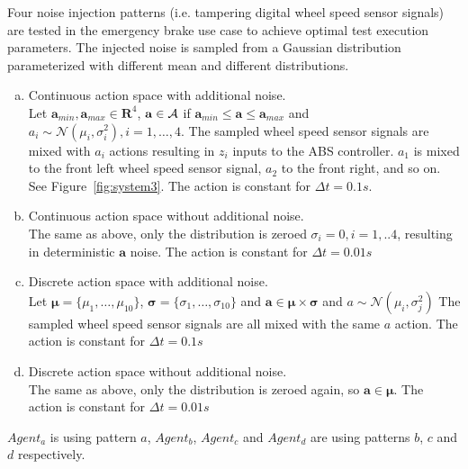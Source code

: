 \documentclass[a4paper, fleqn]{template/cas-dc}
\begin{document}
	Four noise injection patterns (i.e. tampering digital wheel speed sensor signals) are tested in the emergency brake use case to achieve optimal test execution parameters. The injected noise is sampled from a Gaussian distribution parameterized with different mean and different distributions.
	
	\begin{enumerate}[a)]
		\item Continuous action space with additional noise.\\
		Let $\mathbf{a}_{min}, \mathbf{a}_{max} \in \mathbf{R}^4$, $\mathbf{a} \in \mathcal{A}$ if $\mathbf{a}_{min} \leq \mathbf{a} \leq \mathbf{a}_{max}$ and $a_i \sim \mathcal{N}(\mu_i, \sigma_i^2), i=1,\ldots,4$. The sampled wheel speed sensor signals are mixed with $a_i$ actions resulting in $z_i$ inputs to the ABS controller. $a_1$ is mixed to the front left wheel speed sensor signal, $a_2$ to the front right, and so on. See Figure~\ref{fig:system3}. The action is constant for $\Delta t = 0.1 s$.\\
		\item Continuous action space without additional noise.\\
		The same as above, only the distribution is zeroed $\sigma_i=0, i=1,..4$, resulting in deterministic $\textbf{a}$ noise. The action is constant for $\Delta t = 0.01 s$
		\item Discrete action space with additional noise.\\
		Let $\boldsymbol{\mu} = \{\mu_1,\ldots,\mu_{10} \}$, $\boldsymbol{\sigma} = \{\sigma_1,\ldots,\sigma_{10}\}$ and $\textbf{a} \in \boldsymbol{\mu} \times \boldsymbol{\sigma}$ and $a \sim \mathcal{N}(\mu_i, \sigma_j^2)$ The sampled wheel speed sensor signals are all mixed with the same $a$ action. The action is constant for $\Delta t = 0.1 s$
		\item Discrete action space without additional noise.\\
		The same as above, only the distribution is zeroed again, so $\textbf{a} \in \boldsymbol{\mu}$. The action is constant for $\Delta t = 0.01 s$
	\end{enumerate}                        		
	
	$Agent_a$ is using pattern $a$, $Agent_b$, $Agent_c$ and $Agent_d$ are using patterns $b$, $c$ and $d$ respectively.
			
\end{document}

